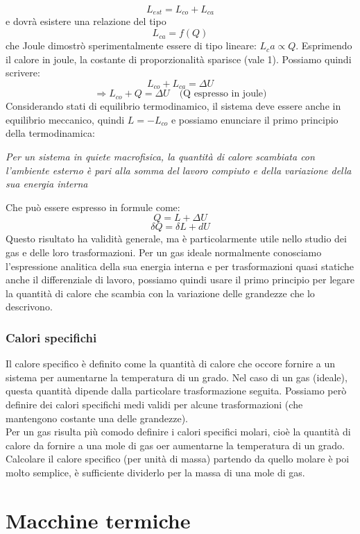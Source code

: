 \documentclass{article}
\begin{document}
$$ L_{est} = L_{co}+L_{ca} $$
e dovrà esistere una relazione del tipo
$$ L_{ca} = f(Q) $$
che Joule dimostrò sperimentalmente essere di tipo lineare: $L_ca\propto Q$. Esprimendo il calore in joule, la costante di proporzionalità sparisce (vale 1). Possiamo quindi scrivere:
$$ L_{co}+L_{ca}=\Delta U $$
$$\Rightarrow L_{co}+Q=\Delta U \quad\text{(Q espresso in joule)} $$
Considerando stati di equilibrio termodinamico, il sistema deve essere anche in equilibrio meccanico, quindi $L=-L_{co}$ e possiamo enunciare il primo principio della termodinamica:
\begin{center}
    \textit{Per un sistema in quiete macrofisica, la quantità di calore scambiata con l'ambiente esterno è pari alla somma del lavoro compiuto e della variazione della sua energia interna}
\end{center}
Che può essere espresso in formule come:
$$ Q=L+\Delta U $$
$$ \delta Q=\delta L + dU $$
Questo risultato ha validità generale, ma è particolarmente utile nello studio dei gas e delle loro trasformazioni. Per un gas ideale normalmente conosciamo l'espressione analitica della sua energia interna e per trasformazioni quasi statiche anche il differenziale di lavoro, possiamo quindi usare il primo principio per legare la quantità di calore che scambia con la variazione delle grandezze che lo descrivono.


\subsubsection{Calori specifichi}
Il calore specifico è definito come la quantità di calore che occore fornire a un sistema per aumentarne la temperatura di un grado. Nel caso di un gas (ideale), questa quantità dipende dalla particolare trasformazione seguita. Possiamo però definire dei calori specifichi medi validi per alcune trasformazioni (che mantengono costante una delle grandezze).\\
Per un gas risulta più comodo definire i calori specifici molari, cioè la quantità di calore da fornire a una mole di gas oer aumentarne la temperatura di un grado. Calcolare il calore specifico (per unità di massa) partendo da quello molare è poi molto semplice, è sufficiente dividerlo per la massa di una mole di gas.


\newpage
\section{Macchine termiche}
\end{document}
